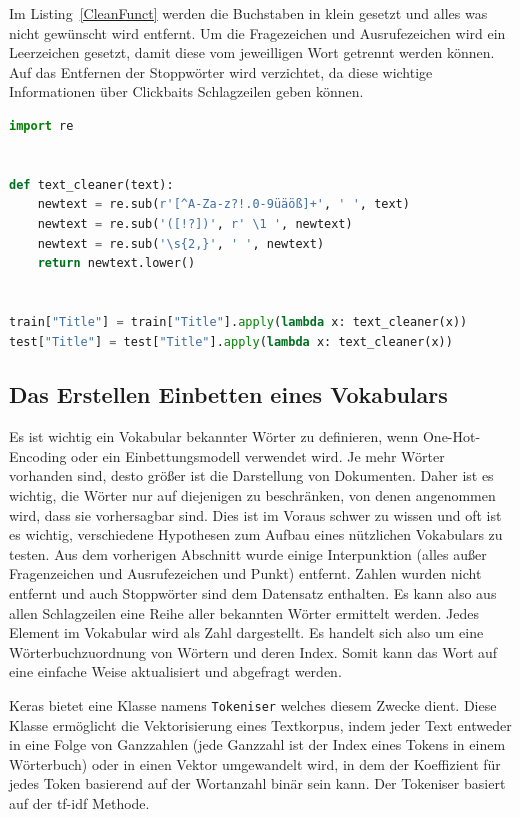 Im Listing~\ref{CleanFunct} werden die Buchstaben in klein gesetzt und alles was nicht gewünscht wird entfernt. Um die Fragezeichen und Ausrufezeichen wird ein Leerzeichen gesetzt, damit diese vom jeweilligen Wort getrennt werden können. Auf das Entfernen der Stoppwörter wird verzichtet, da diese wichtige Informationen über Clickbaits Schlagzeilen geben können.

\begin{lstlisting}[language=Python,caption=Die Preprocessing-Funktion]
import re


def text_cleaner(text):
    newtext = re.sub(r'[^A-Za-z?!.0-9üäöß]+', ' ', text)
    newtext = re.sub('([!?])', r' \1 ', newtext)
    newtext = re.sub('\s{2,}', ' ', newtext)
    return newtext.lower()
    
    
train["Title"] = train["Title"].apply(lambda x: text_cleaner(x))
test["Title"] = test["Title"].apply(lambda x: text_cleaner(x))
\end{lstlisting}\label{CleanFunct}

\subsection{Das Erstellen Einbetten eines Vokabulars}


Es ist wichtig ein Vokabular bekannter Wörter zu definieren, wenn One-Hot-Encoding oder ein Einbettungsmodell verwendet wird. Je mehr Wörter vorhanden sind, desto größer ist die Darstellung von Dokumenten. Daher ist es wichtig, die Wörter nur auf diejenigen zu beschränken, von denen angenommen wird, dass sie vorhersagbar sind. Dies ist im Voraus schwer zu wissen und oft ist es wichtig, verschiedene Hypothesen zum Aufbau eines nützlichen Vokabulars zu testen. Aus dem vorherigen Abschnitt wurde einige Interpunktion (alles außer Fragenzeichen und Ausrufezeichen und Punkt) entfernt. Zahlen wurden nicht entfernt und auch Stoppwörter sind dem Datensatz enthalten. Es kann also aus allen Schlagzeilen eine Reihe aller bekannten Wörter ermittelt werden. Jedes Element im Vokabular wird als Zahl dargestellt. Es handelt sich also um eine Wörterbuchzuordnung von Wörtern und deren Index. Somit kann das Wort auf eine einfache Weise aktualisiert und abgefragt werden.

Keras bietet eine Klasse namens \texttt{Tokeniser} welches diesem Zwecke dient. Diese Klasse ermöglicht die Vektorisierung eines Textkorpus, indem jeder Text entweder in eine Folge von Ganzzahlen (jede Ganzzahl ist der Index eines Tokens in einem Wörterbuch) oder in einen Vektor umgewandelt wird, in dem der Koeffizient für jedes Token basierend auf der Wortanzahl binär sein kann. Der Tokeniser basiert auf der tf-idf Methode.

